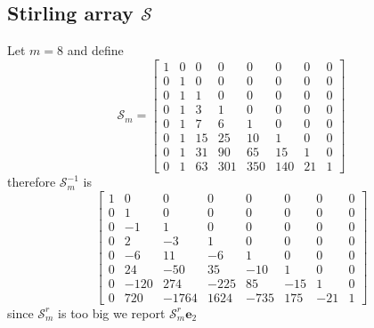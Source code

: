 \subsection{Stirling array $\mathcal{S}$}

Let $m=8$ and define
\begin{displaymath}
\mathcal{S}_{m} = \left[\begin{matrix}1 & 0 & 0 & 0 & 0 & 0 & 0 & 0\\0 & 1 & 0 & 0 & 0 & 0 & 0 & 0\\0 & 1 & 1 & 0 & 0 & 0 & 0 & 0\\0 & 1 & 3 & 1 & 0 & 0 & 0 & 0\\0 & 1 & 7 & 6 & 1 & 0 & 0 & 0\\0 & 1 & 15 & 25 & 10 & 1 & 0 & 0\\0 & 1 & 31 & 90 & 65 & 15 & 1 & 0\\0 & 1 & 63 & 301 & 350 & 140 & 21 & 1\end{matrix}\right]
\end{displaymath}
therefore $\mathcal{S}_{m}^{-1}$ is
\begin{displaymath}
\left[\begin{matrix}1 & 0 & 0 & 0 & 0 & 0 & 0 & 0\\0 & 1 & 0 & 0 & 0 & 0 & 0 & 0\\0 & -1 & 1 & 0 & 0 & 0 & 0 & 0\\0 & 2 & -3 & 1 & 0 & 0 & 0 & 0\\0 & -6 & 11 & -6 & 1 & 0 & 0 & 0\\0 & 24 & -50 & 35 & -10 & 1 & 0 & 0\\0 & -120 & 274 & -225 & 85 & -15 & 1 & 0\\0 & 720 & -1764 & 1624 & -735 & 175 & -21 & 1\end{matrix}\right]
\end{displaymath}
since $\mathcal{S}_{m}^{r}$ is too big we report $\mathcal{S}_{m}^{r}\textbf{e}_{2}$ 
